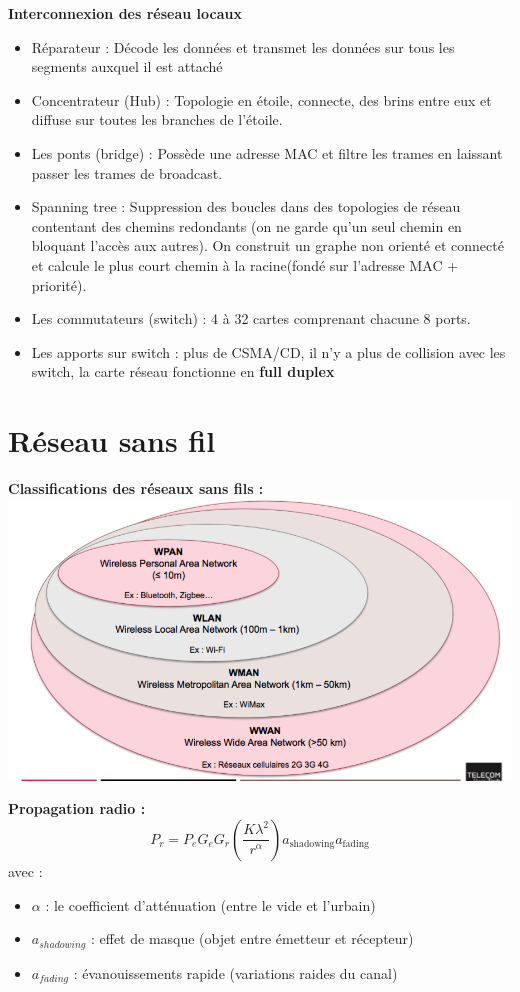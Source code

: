 \documentclass[a4paper,9pt, twocolumn]{article}
\begin{document}
	\textbf{Interconnexion des réseau locaux}
	\begin{itemize}
		\item Réparateur : Décode les données et transmet les données sur tous les segments auxquel il est attaché
		\item Concentrateur (Hub) : Topologie en étoile, connecte, des brins entre eux et diffuse sur toutes les branches de l'étoile.
		\item Les ponts (bridge) : Possède une adresse MAC et filtre les trames en  laissant passer les trames de broadcast.
		\item Spanning tree : Suppression des boucles dans des topologies de réseau contentant des chemins redondants (on ne garde qu'un seul chemin en bloquant l'accès aux autres).
			On construit un graphe non orienté et connecté et calcule le plus court chemin à la racine(fondé sur l'adresse MAC + priorité).
		\item Les commutateurs (switch) : 4 à 32 cartes comprenant chacune 8 ports.
		\item Les apports sur switch : plus de CSMA/CD, il n'y a plus de collision avec les switch, la carte réseau fonctionne en \textbf{full duplex}
	\end{itemize}


\section*{Réseau sans fil}

	\textbf{Classifications des réseaux sans fils :} 
	\includegraphics[scale=0.6]{res.png}
	
	\textbf{Propagation radio : } 
	$$P_{r} = P_{e} G_{e} G_{r} \left( \frac{K\lambda^{2}}{r^{\alpha}} \right) a_{\text{shadowing}} a_{\text{fading}}$$
	avec : 
	\begin{itemize}
		\item $\alpha$ : le coefficient d'atténuation (entre le vide et l'urbain)
		\item $a_{shadowing}$ : effet de masque (objet entre émetteur et récepteur)
		\item $a_{fading}$ : évanouissements rapide (variations raides du canal)
	\end{itemize}
	
\end{document}
